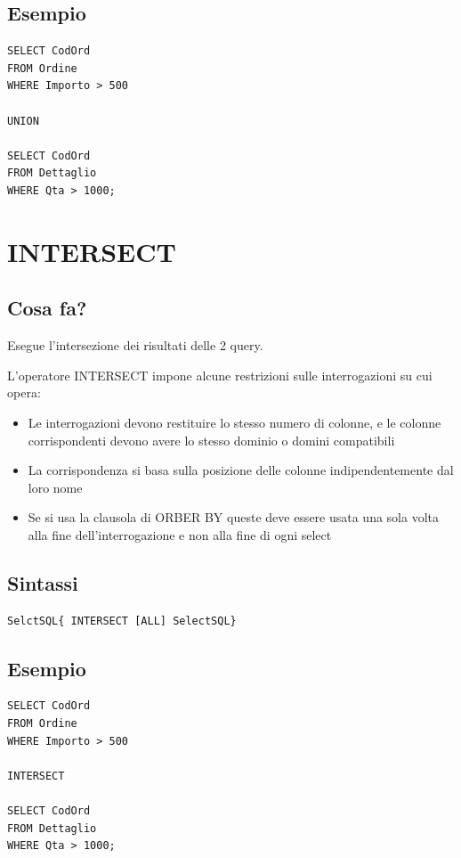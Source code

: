 \subsection{Esempio}
\begin{lstlisting}[language=sql_generic]
SELECT CodOrd 
FROM Ordine 
WHERE Importo > 500

UNION 

SELECT CodOrd 
FROM Dettaglio 
WHERE Qta > 1000;
\end{lstlisting}

\section{INTERSECT}
\subsection{Cosa fa?}
Esegue l'intersezione dei risultati delle 2 query.

L'operatore INTERSECT impone alcune restrizioni sulle interrogazioni su cui opera:
\begin{itemize}
    \item Le interrogazioni devono restituire lo stesso numero di colonne, e le colonne corrispondenti devono avere lo stesso dominio o domini compatibili
    \item La corrispondenza si basa sulla posizione delle colonne indipendentemente dal loro nome
    \item Se si usa la clausola di ORBER BY queste deve essere usata una sola volta alla fine dell'interrogazione e non alla fine di ogni select
\end{itemize}

\subsection{Sintassi}
\begin{lstlisting}[language=sql_generic]
SelctSQL{ INTERSECT [ALL] SelectSQL}
\end{lstlisting}

\subsection{Esempio}
\begin{lstlisting}[language=sql_generic]
SELECT CodOrd 
FROM Ordine 
WHERE Importo > 500

INTERSECT

SELECT CodOrd 
FROM Dettaglio 
WHERE Qta > 1000;
\end{lstlisting}

